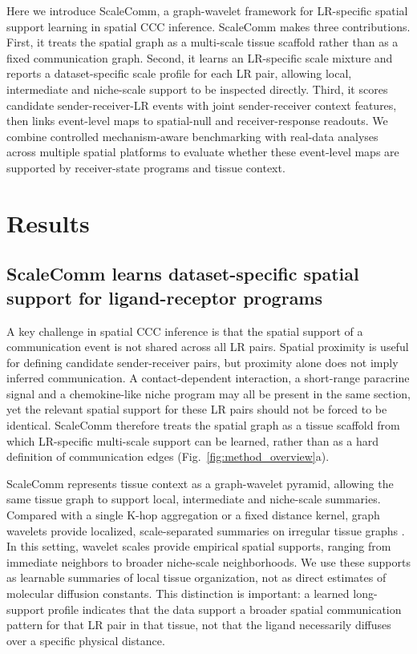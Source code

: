 \documentclass[referee,lineno,pdflatex,sn-vancouver-num]{sn-jnl}
\begin{document}
Here we introduce ScaleComm, a graph-wavelet framework for LR-specific spatial support learning in spatial CCC inference. ScaleComm makes three contributions. First, it treats the spatial graph as a multi-scale tissue scaffold rather than as a fixed communication graph. Second, it learns an LR-specific scale mixture and reports a dataset-specific scale profile for each LR pair, allowing local, intermediate and niche-scale support to be inspected directly. Third, it scores candidate sender-receiver-LR events with joint sender-receiver context features, then links event-level maps to spatial-null and receiver-response readouts. We combine controlled mechanism-aware benchmarking with real-data analyses across multiple spatial platforms to evaluate whether these event-level maps are supported by receiver-state programs and tissue context.

\section{Results}\label{sec:results}

\subsection{ScaleComm learns dataset-specific spatial support for ligand-receptor programs}

A key challenge in spatial CCC inference is that the spatial support of a communication event is not shared across all LR pairs. Spatial proximity is useful for defining candidate sender-receiver pairs, but proximity alone does not imply inferred communication. A contact-dependent interaction, a short-range paracrine signal and a chemokine-like niche program may all be present in the same section, yet the relevant spatial support for these LR pairs should not be forced to be identical. ScaleComm therefore treats the spatial graph as a tissue scaffold from which LR-specific multi-scale support can be learned, rather than as a hard definition of communication edges (Fig.~\ref{fig:method_overview}a).

ScaleComm represents tissue context as a graph-wavelet pyramid, allowing the same tissue graph to support local, intermediate and niche-scale summaries. Compared with a single K-hop aggregation or a fixed distance kernel, graph wavelets provide localized, scale-separated summaries on irregular tissue graphs \citep{hammond2011wavelets,shuman2013graph,diffusionmaps2006}. In this setting, wavelet scales provide empirical spatial supports, ranging from immediate neighbors to broader niche-scale neighborhoods. We use these supports as learnable summaries of local tissue organization, not as direct estimates of molecular diffusion constants. This distinction is important: a learned long-support profile indicates that the data support a broader spatial communication pattern for that LR pair in that tissue, not that the ligand necessarily diffuses over a specific physical distance.
\end{document}
